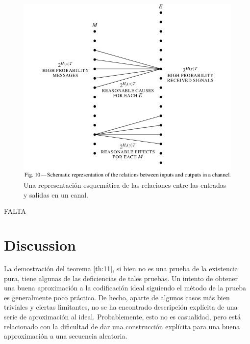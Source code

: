 \begin{figure}[!ht]
\centerline{\includegraphics[width=140mm]{Imagenes/Pagina23-Figura10.png}}
\caption{Una representaci\'{o}n esquem\'{a}tica de las relaciones
  entre las entradas y salidas en un canal.}
\label{fig:10}
\end{figure}

FALTA

\clearpage

\chapter{Discussion}
\label{sec:14}

La demostraci\'{o}n del teorema \ref{th:11}, si bien no es una prueba
de la existencia pura, tiene algunas de las deficiencias de tales
pruebas. Un intento de obtener una buena aproximaci\'{o}n a la
codificaci\'{o}n ideal siguiendo el m\'{e}todo de la prueba es
generalmente poco pr\'{a}ctico. De hecho, aparte de algunos casos
m\'{a}s bien triviales y ciertas limitantes, no se ha encontrado
descripci\'{o}n expl\'{i}cita de una serie de aproximaci\'{o}n al
ideal. Probablemente, esto no es casualidad, pero est\'{a} relacionado
con la dificultad de dar una construcci\'{o}n expl\'{i}cita para una
buena approximaci\'{o}n a una secuencia aleatoria.

